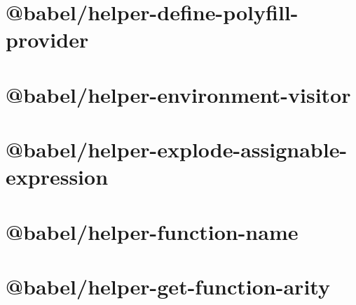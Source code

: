 \documentclass[twoside]{book}
\newcommand{\+}{\discretionary{\mbox{\scriptsize$\hookleftarrow$}}{}{}}
\begin{document}
\chapter{@babel/helper-\/define-\/polyfill-\/provider}
\label{md__c___users_vaishnavi_jadhav__desktop__developer_code_mean_stack_example_client_node_modules__0b458d27adeb88121443218b1e0e7ddc}

\chapter{@babel/helper-\/environment-\/visitor}
\label{md__c___users_vaishnavi_jadhav__desktop__developer_code_mean_stack_example_client_node_modules__d7bb4b176968395136d1cb4a8db67c9c}

\chapter{@babel/helper-\/explode-\/assignable-\/expression}
\label{md__c___users_vaishnavi_jadhav__desktop__developer_code_mean_stack_example_client_node_modules__534f8027159521dc6529e55137c97146}

\chapter{@babel/helper-\/function-\/name}
\label{md__c___users_vaishnavi_jadhav__desktop__developer_code_mean_stack_example_client_node_modules__d648cfac0b6b9b145d22a88e46c82c4f}

\chapter{@babel/helper-\/get-\/function-\/arity}
\label{md__c___users_vaishnavi_jadhav__desktop__developer_code_mean_stack_example_client_node_modules__2ab6c9079055f5223d2acfd8a5196c64}

\end{document}
